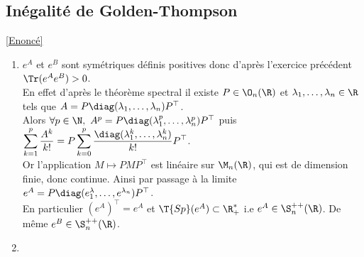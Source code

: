 \documentclass[8pt]{book}
\begin{document}
	\subsection{Inégalité de Golden-Thompson}
	\label{Inégalité de Golden-Thompson corrigé}
	\textcolor{blue}{\hyperref[Inégalité de Golden-Thompson]{[Enoncé]}}\\
	\begin{enumerate}[leftmargin=*]
		\item $e^A$ et $e^B$ sont symétriques définis positives donc d'après l'exercice précédent $\Tr(e^Ae^B)>0$.\\
		En effet d'après le théorème spectral il existe $P\in \O_n(\R)$ et $\lambda_1,\dots,\lambda_n\in \R$ tels que $A=P\diag(\lambda_1,\dots,\lambda_n)P^\top$.\\
		Alors $\forall p\in \N,\ A^p=P\diag(\lambda_1^p,\dots,\lambda_n^p)P^\top$ puis $\displaystyle\sum_{k=1}^p\frac{A^k}{k!}=P\sum_{k=0}^p\frac{\diag(\lambda_1^k,\dots,\lambda_n^k)}{k!}P^\top$.\\
		Or l'application $M \mapsto PMP^\top$ est linéaire sur $\M_n(\R)$, qui est de dimension finie, donc continue. Ainsi par passage à la limite $e^A=P\diag(e^\lambda_1,\dots,e^{\lambda_n})P^\top$.\\
		En particulier $(e^A)^\top=e^A$ et $\T{Sp}(e^A)\subset \R^*_+$ i.e $e^A\in \S_n^{++}(\R)$. De même $e^B\in \S_n^{++}(\R)$.
		\item 
	\end{enumerate}
	
\end{document}

